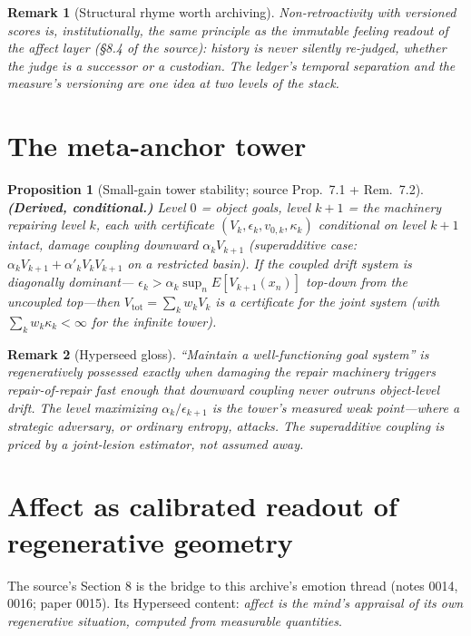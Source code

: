 \documentclass[11pt]{article}
\newtheorem{proposition}{Proposition}
\newtheorem{remark}{Remark}
\begin{document}
\begin{remark}[Structural rhyme worth archiving]
Non-retroactivity with versioned scores is, institutionally, the same principle as the
immutable feeling readout of the affect layer (\S8.4 of the source): \emph{history is
never silently re-judged}, whether the judge is a successor or a custodian. The ledger's
temporal separation and the measure's versioning are one idea at two levels of the stack.
\end{remark}

\section{The meta-anchor tower}

\begin{proposition}[Small-gain tower stability; source Prop.~7.1 + Rem.~7.2]\label{prop:tower}
\textbf{(Derived, conditional.)} Level $0$ = object goals, level $k{+}1$ = the machinery
repairing level $k$, each with certificate $(V_k, \epsilon_k, v_{0,k}, \kappa_k)$
conditional on level $k{+}1$ intact, damage coupling downward
$\alpha_k V_{k+1}$ (superadditive case: $\alpha_k V_{k+1} + \alpha'_k V_k V_{k+1}$ on a
restricted basin). If the coupled drift system is diagonally dominant---
$\epsilon_k > \alpha_k \sup_n E[V_{k+1}(x_n)]$ top-down from the uncoupled top---then
$V_{\mathrm{tot}} = \sum_k w_k V_k$ is a certificate for the joint system (with
$\sum_k w_k \kappa_k < \infty$ for the infinite tower).
\end{proposition}

\begin{remark}[Hyperseed gloss]
``Maintain a well-functioning goal system'' is regeneratively possessed exactly when
damaging the repair machinery triggers repair-of-repair fast enough that downward
coupling never outruns object-level drift. The level maximizing $\alpha_k/\epsilon_{k+1}$
is the tower's \emph{measured weak point}---where a strategic adversary, or ordinary
entropy, attacks. The superadditive coupling is priced by a joint-lesion estimator, not
assumed away.
\end{remark}

\section{Affect as calibrated readout of regenerative geometry}

The source's Section 8 is the bridge to this archive's emotion thread (notes 0014, 0016;
paper 0015). Its Hyperseed content: \emph{affect is the mind's appraisal of its own
regenerative situation, computed from measurable quantities}.
\end{document}
